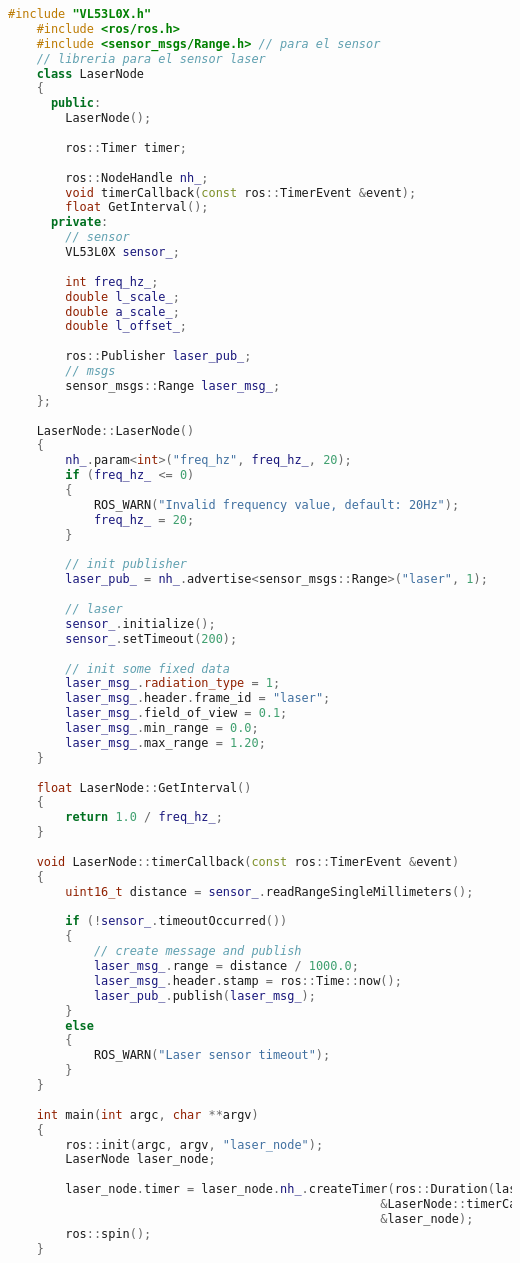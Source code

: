 \begin{lstlisting}[title={laser\_node.cpp},language=c++]
    #include "VL53L0X.h"
    #include <ros/ros.h>
    #include <sensor_msgs/Range.h> // para el sensor
    // libreria para el sensor laser
    class LaserNode
    {
      public:
        LaserNode();
    
        ros::Timer timer;
    
        ros::NodeHandle nh_;
        void timerCallback(const ros::TimerEvent &event);
        float GetInterval();
      private:
        // sensor
        VL53L0X sensor_;
    
        int freq_hz_;
        double l_scale_;
        double a_scale_;
        double l_offset_;
    
        ros::Publisher laser_pub_;
        // msgs
        sensor_msgs::Range laser_msg_;
    };
    
    LaserNode::LaserNode()
    {
        nh_.param<int>("freq_hz", freq_hz_, 20);
        if (freq_hz_ <= 0)
        {
            ROS_WARN("Invalid frequency value, default: 20Hz");
            freq_hz_ = 20;
        }
    
        // init publisher
        laser_pub_ = nh_.advertise<sensor_msgs::Range>("laser", 1);
        
        // laser
        sensor_.initialize();
        sensor_.setTimeout(200);
        
        // init some fixed data 
        laser_msg_.radiation_type = 1;
        laser_msg_.header.frame_id = "laser";
        laser_msg_.field_of_view = 0.1;
        laser_msg_.min_range = 0.0;
        laser_msg_.max_range = 1.20;
    }
    
    float LaserNode::GetInterval()
    {
        return 1.0 / freq_hz_;
    }
    
    void LaserNode::timerCallback(const ros::TimerEvent &event)
    {
        uint16_t distance = sensor_.readRangeSingleMillimeters();
    
        if (!sensor_.timeoutOccurred())
        {
            // create message and publish
            laser_msg_.range = distance / 1000.0;
            laser_msg_.header.stamp = ros::Time::now();
            laser_pub_.publish(laser_msg_);
        }
        else
        {
            ROS_WARN("Laser sensor timeout");
        }
    }
    
    int main(int argc, char **argv)
    {
        ros::init(argc, argv, "laser_node");
        LaserNode laser_node;
        
        laser_node.timer = laser_node.nh_.createTimer(ros::Duration(laser_node.GetInterval()), 
                                                    &LaserNode::timerCallback, 
                                                    &laser_node);
        ros::spin();
    }
\end{lstlisting}
